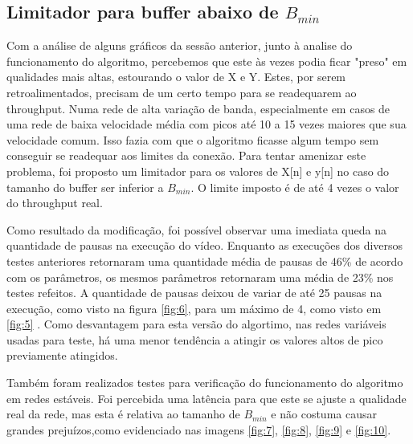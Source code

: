 \documentclass[10pt,twocolumn,letterpaper]{article}
\begin{document}
	\subsection{Limitador para buffer abaixo de $B_{min}$}
	
	Com a análise de alguns gráficos da sessão anterior, junto à analise do funcionamento do algoritmo, percebemos que este às vezes podia ficar "preso" em qualidades mais altas, estourando o valor de X e Y. Estes, por serem retroalimentados, precisam de um certo tempo para se readequarem ao throughput. Numa rede de alta variação de banda, especialmente em casos de uma rede de baixa velocidade média com picos até 10 a 15 vezes maiores que sua velocidade comum. Isso fazia com que o algoritmo ficasse algum tempo sem conseguir se readequar aos limites da conexão. Para tentar amenizar este problema, foi proposto um limitador para os valores de X[n] e y[n] no caso do tamanho do buffer ser inferior a $B_{min}$. O limite imposto é de até 4 vezes o valor do throughput real.
	
	Como resultado da modificação, foi possível observar uma imediata queda na quantidade de pausas na execução do vídeo. Enquanto as execuções dos diversos testes anteriores retornaram uma quantidade média de pausas de 46\% de acordo com os parâmetros, os mesmos parâmetros retornaram uma média de 23\% nos testes refeitos. A quantidade de pausas deixou de variar de até 25 pausas na execução, como visto na figura \ref{fig:6}, para um máximo de 4, como visto em \ref{fig:5} . Como desvantagem para esta versão do algortimo, nas redes variáveis usadas para teste, há uma menor tendência a atingir os valores altos de pico previamente atingidos.
	
	Também foram realizados testes para verificação do funcionamento do algoritmo em redes estáveis. Foi percebida uma latência para que este se ajuste a qualidade real da rede, mas esta é relativa ao tamanho de $B_{min}$ e não costuma causar grandes prejuízos,como evidenciado nas imagens \ref{fig:7}, \ref{fig:8}, \ref{fig:9} e \ref{fig:10}.
	
\end{document}
